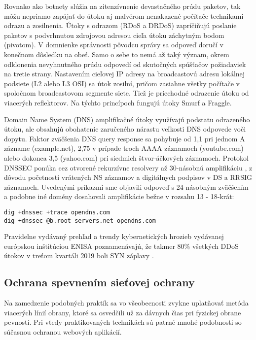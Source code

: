 \documentclass[12pt, a4paper]{article}
\begin{document}
Rovnako ako botnety slúžia na zitenzívnenie devastačného prúdu paketov, tak môžu nepriamo zapájať 
do útoku aj malvérom nenakazené počítače technikami odrazu a zosilnenia. Útoky s odrazom (RDoS a DRDoS) 
zapríčiňujú poslanie paketov s podvrhnutou zdrojovou adresou cieľa útoku záchytným bodom (pivotom).
V domnienke správnosti pôvodcu správy sa odpoveď doručí v konečnom dôsledku na obeť. Samo o sebe to nemá až 
taký význam, okrem odklonenia nevyhnutného prúdu odpovedí od skutočných spúšťačov požiadaviek na tretie
strany. Nastavením cieľovej IP adresy na broadcastovú adresu lokálnej podsiete (L2 alebo L3 OSI) sa
útok zosilní, pričom zasiahne všetky počítače v spoločnom broadcastovom segmente siete. Tiež je priechodné 
odrazenie útoku od viacerých reflektorov. Na týchto princípoch fungujú útoky Smurf a Fraggle.

Domain Name System (DNS) amplifikačné útoky využívajú podstatu odrazeného útoku, ale obsahujú obohatenie
zaručeného nárastu veľkosti DNS odpovede voči dopytu. Faktor zväčšenia DNS query response sa pohybuje
od 1,1 pri jednom A zázname (example.net), 2,75 v prípade troch AAAA záznamoch (youtube.com) alebo 
dokonca 3,5 (yahoo.com) pri siedmich štvor-áčkových záznamoch. Protokol DNSSEC ponúka
cez otvorené rekurzívne resolvery až 30-násobnú amplifikáciu \cite{csirt-ddos}, 
z dôvodu početnosti vrátených NS záznamov a digitálnych podpisov v DS a RRSIG záznamoch. 
Uvedenými príkazmi sme objavili odpoveď s 24-násobným zväčšením a podobne iné domény dosahovali
amplifikácie bežne v rozsahu 13 - 18-krát:
\begin{lstlisting}
dig +dnssec +trace opendns.com
dig +dnssec @b.root-servers.net opendns.com
\end{lstlisting}

Pravidelne vydávaný prehľad a trendy kybernetických hrozieb vydávanej európskou inštitúciou ENISA
poznamenávajú, že takmer 80\% všetkých DDoS útokov v treťom kvartáli 2019 boli SYN záplavy 
\cite{enisa-ddos}. 


\subsection{Ochrana spevnením sieťovej ochrany}
Na zamedzenie podobných praktík sa vo všeobecnosti zvykne uplatňovať metóda viacerých línií obrany, 
ktoré sa osvedčili už za dávnych čias pri fyzickej obrane pevností. Pri vtedy praktikovaných technikách sú patrné mnohé podobnosti so súčasnou ochranou webových aplikácií.
\end{document}
